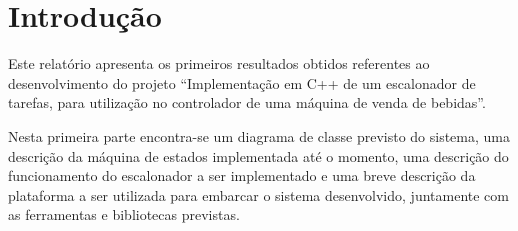 %
%
%
%
%

%
%
%
%
%

\section{Introdução} \label{sec:introduction}

Este relatório apresenta os primeiros resultados obtidos referentes ao desenvolvimento do projeto ``Implementação em C++ de um escalonador de tarefas, para utilização no controlador de uma máquina de venda de bebidas''.

Nesta primeira parte encontra-se um diagrama de classe previsto do sistema, uma descrição da máquina de estados implementada até o momento, uma descrição do funcionamento do escalonador a ser implementado e uma breve descrição da plataforma a ser utilizada para embarcar o sistema desenvolvido, juntamente com as ferramentas e bibliotecas previstas.
